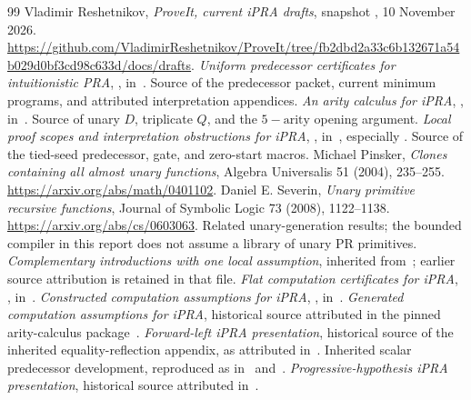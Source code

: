 \begin{thebibliography}{99}
 Vladimir Reshetnikov, \emph{ProveIt, current iPRA drafts}, snapshot , 10 November 2026. \url{https://github.com/VladimirReshetnikov/ProveIt/tree/fb2dbd2a33c6b132671a54b029d0bf3cd98c633d/docs/drafts}.
 \emph{Uniform predecessor certificates for intuitionistic PRA}, , in~\cite{snapshot}. Source of the predecessor packet, current minimum programs, and attributed interpretation appendices.
 \emph{An arity calculus for iPRA}, , in~\cite{snapshot}. Source of unary $D$, triplicate $Q$, and the $5-\mathrm{arity}$ opening argument.
 \emph{Local proof scopes and interpretation obstructions for iPRA}, , in~\cite{snapshot}, especially . Source of the tied-seed predecessor, gate, and zero-start macros.
 Michael Pinsker, \emph{Clones containing all almost unary functions}, Algebra Universalis 51 (2004), 235--255. \url{https://arxiv.org/abs/math/0401102}.
 Daniel E. Severin, \emph{Unary primitive recursive functions}, Journal of Symbolic Logic 73 (2008), 1122--1138. \url{https://arxiv.org/abs/cs/0603063}. Related unary-generation results; the bounded compiler in this report does not assume a library of unary PR primitives.
 \emph{Complementary introductions with one local assumption}, inherited  from~\cite{uniform}; earlier source attribution is retained in that file.
 \emph{Flat computation certificates for iPRA}, , in~\cite{snapshot}.
 \emph{Constructed computation assumptions for iPRA}, , in~\cite{snapshot}.
 \emph{Generated computation assumptions for iPRA}, historical source attributed in the pinned arity-calculus package~\cite{arity}.
 \emph{Forward-left iPRA presentation}, historical source of the inherited equality-reflection appendix, as attributed in~\cite{uniform}.
 Inherited scalar predecessor development, reproduced as  in~\cite{flat} and~\cite{uniform}.
 \emph{Progressive-hypothesis iPRA presentation}, historical source attributed in~\cite{uniform}.
\end{thebibliography}

